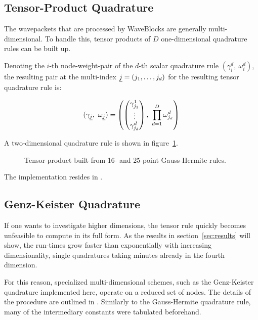\subsection{Tensor-Product Quadrature}
\label{subsec:tpquad}

The wavepackets that are processed by WaveBlocks are generally multi-dimensional.
To handle this, tensor products of $D$ one-dimensional quadrature rules can be
built up.

Denoting the $i$-th node-weight-pair of the $d$-th scalar quadrature rule
$(\gamma_i^d,\ \omega_i^d)$, the resulting pair at the multi-index $\underline{j} =
(j_1, \ldots, j_d)$ for the resulting tensor quadrature rule is:

\begin{equation}
  (\gamma_{\underline{j}},\ \omega_{\underline{j}}) = \left(
    \begin{pmatrix} \gamma_{j_1}^1 \\ \vdots \\ \gamma_{j_d}^d \end{pmatrix},
    \ \prod_{d=1}^D \omega_{j_d}^d
  \right)
\end{equation}

A two-dimensional quadrature rule is shown in figure~\ref{fig:tpexample}.

\begin{figure}
  \center
  
  \caption{Tensor-product built from 16- and 25-point Gauss-Hermite rules.}
  \label{fig:tpexample}
\end{figure}

The implementation resides in .


\subsection{Genz-Keister Quadrature}
\label{subsec:gkquad}

If one wants to investigate higher dimensions, the tensor rule quickly becomes
unfeasible to compute in its full form.
As the results in section~\ref{sec:results} will show, the run-times grow
faster than exponentially with increasing dimensionality, single quadratures
taking minutes already in the fourth dimension.

For this reason, specialized multi-dimensional schemes, such as the Genz-Keister
quadrature implemented here, operate on a reduced set of nodes.
The details of the procedure are outlined in \cite{B15_601}.
Similarly to the Gauss-Hermite quadrature rule, many of the intermediary
constants were tabulated beforehand.

